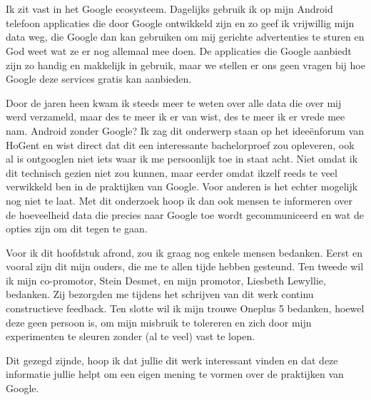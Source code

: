 
\chapter*{}
\label{ch:voorwoord}


Ik zit vast in het Google ecosysteem. Dagelijks gebruik ik op mijn Android telefoon applicaties die door Google ontwikkeld zijn en zo geef ik vrijwillig mijn data weg, die Google dan kan gebruiken om mij gerichte advertenties te sturen en God weet wat ze er nog allemaal mee doen. De applicaties die Google aanbiedt zijn zo handig en makkelijk in gebruik, maar we stellen er ons geen vragen bij hoe Google deze services gratis kan aanbieden. 

Door de jaren heen kwam ik steeds meer te weten over alle data die over mij werd verzameld, maar des te meer ik er van wist, des te meer ik er vrede mee nam. Android zonder Google? Ik zag dit onderwerp staan op het ideeënforum van HoGent en wist direct dat dit een interessante bachelorproef zou opleveren, ook al is ontgooglen niet iets waar ik me persoonlijk toe in staat acht. Niet omdat ik dit technisch gezien niet zou kunnen, maar eerder omdat ikzelf reeds te veel verwikkeld ben in de praktijken van Google. Voor anderen is het echter mogelijk nog niet te laat. Met dit onderzoek hoop ik dan ook mensen te informeren over de hoeveelheid data die precies naar Google toe wordt gecommuniceerd en wat de opties zijn om dit tegen te gaan.

Voor ik dit hoofdstuk afrond, zou ik graag nog enkele mensen bedanken. Eerst en vooral zijn dit mijn ouders, die me te allen tijde hebben gesteund. Ten tweede wil ik mijn co-promotor, Stein Desmet, en mijn promotor, Liesbeth Lewyllie, bedanken. Zij bezorgden me tijdens het schrijven van dit werk continu constructieve feedback. Ten slotte wil ik mijn trouwe Oneplus 5 bedanken, hoewel deze geen persoon is, om mijn misbruik te tolereren en zich door mijn experimenten te sleuren zonder (al te veel) vast te lopen.

Dit gezegd zijnde, hoop ik dat jullie dit werk interessant vinden en dat deze informatie jullie helpt om een eigen mening te vormen over de praktijken van Google.

